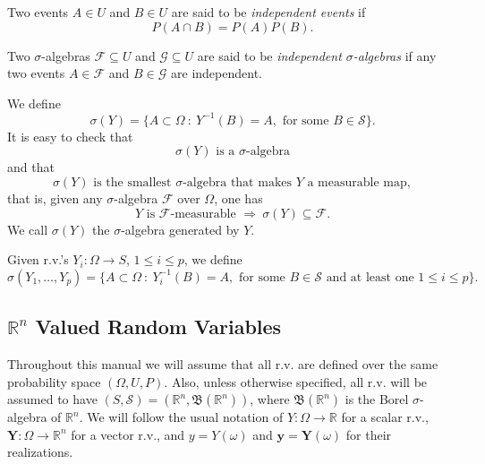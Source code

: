 Two events $A\in U$ and $B\in U$ are said to be {\it independent events} if
\begin{equation*}
P(A\cap B)=P(A)P(B).
\end{equation*}

Two $\sigma$-algebras $\mathcal{F}\subseteq U$ and $\mathcal{G}\subseteq U$ are said to be {\it independent $\sigma$-algebras} if
any two events $A\in\mathcal{F}$ and $B\in\mathcal{G}$ are independent.

We define
\begin{equation*}
\sigma(Y) = \{A\subset\Omega~:~Y^{-1}(B)=A,\mbox{ for some }B\in\mathcal{S}\}.
\end{equation*}
It is easy to check that
\begin{equation*}
\sigma(Y)\mbox{ is a }\sigma\mbox{-algebra}
\end{equation*}
and that
\begin{equation*}
\sigma(Y)\mbox{ is the smallest }\sigma\mbox{-algebra}\mbox{ that makes }Y\mbox{ a measurable map},
\end{equation*}
that is, given any $\sigma$-algebra $\mathcal{F}$ over $\Omega$, one has
\begin{equation}\label{eq-property-of-generated-sigma-alg}
Y\mbox{ is }\mathcal{F}\mbox{-measurable }\Rightarrow~\sigma(Y)\subseteq\mathcal{F}.
\end{equation}
We call $\sigma(Y)$ the $\sigma$-algebra generated by $Y$.

Given r.v.'s $Y_i:\Omega\rightarrow S$, $1\leqslant i\leqslant p$, we define
\begin{equation*}
\sigma(Y_1,\ldots,Y_p) = \{A\subset\Omega~:~Y_i^{-1}(B)=A,\mbox{ for some }B\in\mathcal{S}\mbox{ and at least one }1\leqslant i\leqslant p\}.
\end{equation*}

\subsection{$\mathbb{R}^n$ Valued Random Variables}

Throughout this manual we will assume that all r.v. are defined over the same probability space $(\Omega,U,P)$.
Also, unless otherwise specified, all r.v. will be assumed to have
$(S,\mathcal{S})=(\mathbb{R}^n,\mathfrak{B}(\mathbb{R}^n))$,
where $\mathfrak{B}(\mathbb{R}^n)$ is the Borel $\sigma$-algebra of $\mathbb{R}^n$.
We will follow the usual notation of
$Y:\Omega\rightarrow\mathbb{R}$ for a scalar r.v.,
$\mathbf{Y}:\Omega\rightarrow\mathbb{R}^n$ for a vector r.v.,
and $y=Y(\omega)$ and $\mathbf{y}=\mathbf{Y}(\omega)$ for their realizations.

